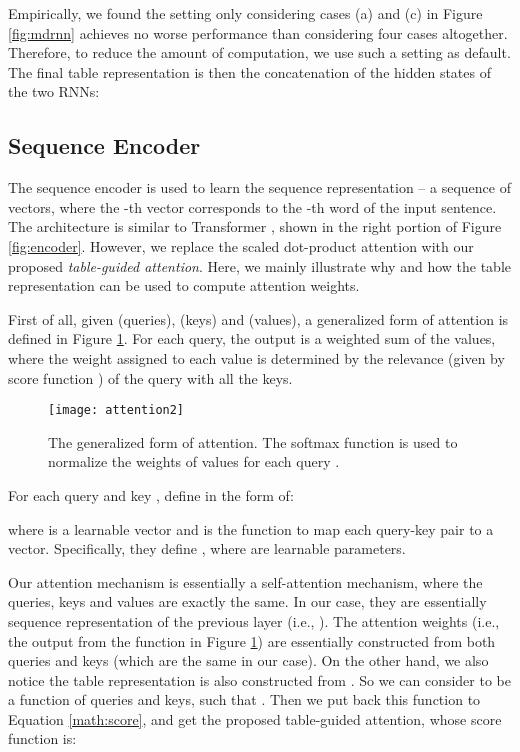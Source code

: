 \documentclass[11pt,a4paper]{article}
\begin{document}
Empirically, we found the setting only considering cases (a) and (c) in Figure \ref{fig:mdrnn} achieves no worse performance than considering four cases altogether.
Therefore, to reduce the amount of computation, we use such a setting as default.
The final table representation is then the concatenation of the hidden states of the two RNNs:


\subsection{Sequence Encoder}

The sequence encoder is used to learn the sequence representation -- a sequence of vectors,
where the -th vector corresponds to the -th word of the input sentence.
The architecture is similar to Transformer \cite{transformer}, shown in the right portion of Figure \ref{fig:encoder}.
However, we replace the scaled dot-product attention with our proposed {\em table-guided attention}.
Here, we mainly illustrate why and how the table representation can be used to compute attention weights.

First of all, given  (queries),  (keys) and  (values), a generalized form of attention is defined in Figure \ref{fig:attention}.
For each query, the output is a weighted sum of the values, where the weight assigned to each value is determined by the relevance (given by score function ) of the query with all the keys.

\begin{figure}
  \texttt{[image: attention2]}
  \caption{The generalized form of attention. The softmax function is used to normalize the weights of values  for each query .}
  \label{fig:attention}
\end{figure}

For each query  and key , \citet{bahdanau2014neural} define  in the form of:

where  is a learnable vector and  is the function to map each query-key pair to a vector.
Specifically, they define , where  are learnable parameters.

Our attention mechanism is essentially a self-attention mechanism, where the queries, keys and values are exactly the same. In our case, they are essentially sequence representation  of the previous layer (i.e., ).
The attention weights (i.e., the output from the function  in Figure \ref{fig:attention}) are essentially constructed from both queries and keys (which are the same in our case).
On the other hand, we also notice the table representation  is also constructed from . So we can consider  to be a function of queries and keys, such that .
Then we put back this  function to Equation \ref{math:score}, and get the proposed table-guided attention, whose score function is:
\end{document}
